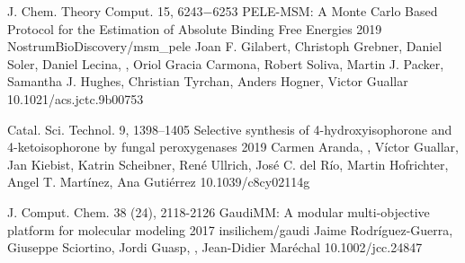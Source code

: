 \begin{cventries}
  \pubentry
    {J. Chem. Theory Comput. 15, 6243−6253} %
    {PELE-MSM: A Monte Carlo Based Protocol for the Estimation of Absolute Binding Free Energies} %
    {2019} %
    {NostrumBioDiscovery/msm\_pele} %
    {Joan F. Gilabert, Christoph Grebner, Daniel Soler, Daniel Lecina, , Oriol Gracia Carmona, Robert Soliva, Martin J. Packer, Samantha J. Hughes, Christian Tyrchan, Anders Hogner, Victor Guallar} %
    {} %
    {10.1021/acs.jctc.9b00753} %

  \pubentry
    {Catal. Sci. Technol. 9, 1398–1405} %
    {Selective synthesis of 4-hydroxyisophorone and 4-ketoisophorone by fungal peroxygenases} %
    {2019} %
    {} %
    {Carmen Aranda, , Víctor Guallar, Jan Kiebist, Katrin Scheibner, René Ullrich, José C. del Río, Martin Hofrichter,
Angel T. Martínez, Ana Gutiérrez} %
    {} %
    {10.1039/c8cy02114g} %

  \pubentry
    {J. Comput. Chem. 38 (24), 2118-2126} %
    {GaudiMM: A modular multi-objective platform for molecular modeling} %
    {2017} %
    {insilichem/gaudi} %
    {Jaime Rodríguez-Guerra, Giuseppe Sciortino, Jordi Guasp, , Jean-Didier Maréchal} %
    {} %
    {10.1002/jcc.24847} %

\end{cventries}
